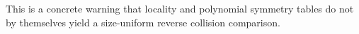 This is a concrete warning that locality and polynomial symmetry tables do not by themselves yield a size-uniform reverse collision comparison.